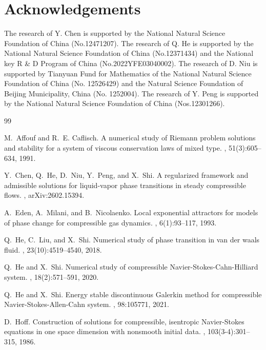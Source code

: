 \documentclass[a4paper,oneside,11pt]{article}
\numberwithin{equation}{section}
\begin{document}
 \section*{Acknowledgements}
The research of Y. Chen is supported by the National Natural Science Foundation of China (No.12471207). 
The research of Q. He is supported by the National Natural Science Foundation of China (No.12371434) and the National key R \& D Program of China (No.2022YFE03040002). 
The research of D. Niu is supported by Tianyuan Fund for Mathematics of the National Natural Science Foundation of China (No. 12526429) and the Natural Science Foundation of Beijing Municipality, China (No. 1252004).
The research of Y. Peng is supported by the National Natural Science Foundation of China (Nos.12301266).


\begin{thebibliography}{99}

M.~Affouf and R.~E. Caflisch.
\newblock A numerical study of Riemann problem solutions and stability for a
  system of viscous conservation laws of mixed type.
, 51(3):605--634, 1991.

Y.~Chen, Q.~He, D.~Niu, Y.~Peng, and X.~Shi.
\newblock A regularized framework and admissible solutions for liquid-vapor
  phase transitions in steady compressible flows.
, arXiv:2602.15394.

A.~Eden, A.~Milani, and B.~Nicolaenko.
\newblock Local exponential attractors for models of phase change for
  compressible gas dynamics.
, 6(1):93--117, 1993.

Q.~He, C.~Liu, and X.~Shi.
\newblock Numerical study of phase transition in van der waals fluid.
, 23(10):4519--4540, 2018.

Q.~He and X.~Shi.
\newblock Numerical study of compressible {N}avier-{S}tokes-{C}ahn-{H}illiard
  system.
, 18(2):571--591, 2020.

Q.~He and X.~Shi.
\newblock Energy stable discontinuous {G}alerkin method for compressible
  {N}avier-{S}tokes-{A}llen-{C}ahn system.
, 98:105771, 2021.

D.~Hoff.
\newblock Construction of solutions for compressible, isentropic
  {N}avier-{S}tokes equations in one space dimension with nonsmooth initial
  data.
, 103(3-4):301--315, 1986.


\end{thebibliography}
\end{document}
